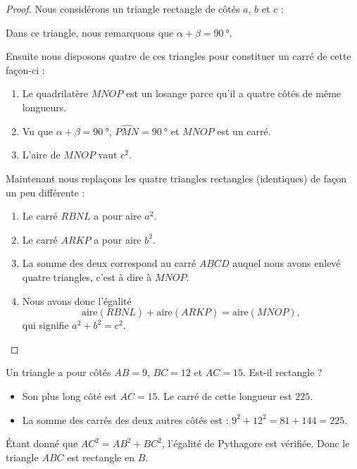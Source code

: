 \begin{proof}

    Nous considérons un triangle rectangle de côtés \( a\), \( b\) et \( c\) :
\begin{center}
   
\end{center}

Dans ce triangle, nous remarquons que \( \alpha+\beta=\SI{90}{\degree}\).

Ensuite nous disposons quatre de ces triangles pour constituer un carré de cette façon-ci :
\begin{center}
   
\end{center}


\begin{enumerate}
    \item
        Le quadrilatère \( MNOP\) est un losange parce qu'il a quatre côtés de même longueurs.
    \item
        Vu que \( \alpha+\beta=\SI{90}{\degree}\), \( \widehat{PMN}=\SI{90}{\degree}\) et \( MNOP\) est un carré.
    \item
        L'aire de \( MNOP\) vaut \( c^2\).
\end{enumerate}

Maintenant nous replaçons les quatre triangles rectangles (identiques) de façon un peu différente :

\begin{center}
   
\end{center}

\begin{enumerate}
    \item
        Le carré \( RBNL\) a pour aire \( a^2\).
    \item
        Le carré \( ARKP\) a pour aire \( b^2\).
    \item
        La somme des deux correspond au carré \( ABCD\) auquel nous avons enlevé quatre triangles, c'est à dire à \( MNOP\).
    \item
        Nous avons donc l'égalité
        \begin{equation}
            \text{aire}(RBNL)+\text{aire}(ARKP)=\text{aire}(MNOP),
        \end{equation}
        qui signifie \( a^2+b^2=c^2\).
\end{enumerate}

\end{proof}

\begin{example}
    Un triangle a pour côtés \( AB=9\), \( BC=12\) et \( AC=15\). Est-il rectangle ?
    \begin{itemize}
        \item Son plus long côté est \( AC=15\). Le carré de cette longueur est \( 225\).
        \item La somme des carrés des deux autres côtés est : \( 9^2+12^2=81+144=225\).
    \end{itemize}
    Étant donné que \( AC^2=AB^2+BC^2\), l'égalité de Pythagore est vérifiée. Donc le triangle \( ABC\) est rectangle en \( B\).
\end{example}


